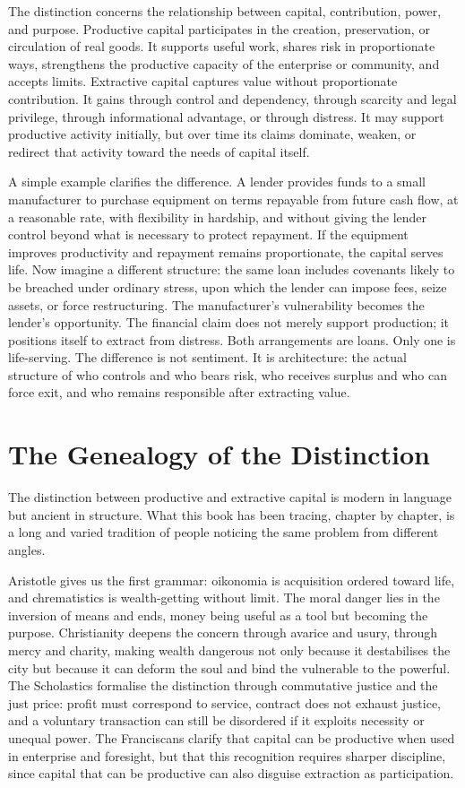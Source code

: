 \documentclass[11pt,a4paper,oneside]{book}
\begin{document}
The distinction concerns the relationship between capital, contribution, power, and purpose. Productive capital participates in the creation, preservation, or circulation of real goods. It supports useful work, shares risk in proportionate ways, strengthens the productive capacity of the enterprise or community, and accepts limits. Extractive capital captures value without proportionate contribution. It gains through control and dependency, through scarcity and legal privilege, through informational advantage, or through distress. It may support productive activity initially, but over time its claims dominate, weaken, or redirect that activity toward the needs of capital itself.

A simple example clarifies the difference. A lender provides funds to a small manufacturer to purchase equipment on terms repayable from future cash flow, at a reasonable rate, with flexibility in hardship, and without giving the lender control beyond what is necessary to protect repayment. If the equipment improves productivity and repayment remains proportionate, the capital serves life. Now imagine a different structure: the same loan includes covenants likely to be breached under ordinary stress, upon which the lender can impose fees, seize assets, or force restructuring. The manufacturer's vulnerability becomes the lender's opportunity. The financial claim does not merely support production; it positions itself to extract from distress. Both arrangements are loans. Only one is life-serving. The difference is not sentiment. It is architecture: the actual structure of who controls and who bears risk, who receives surplus and who can force exit, and who remains responsible after extracting value.

\section*{The Genealogy of the Distinction}

The distinction between productive and extractive capital is modern in language but ancient in structure. What this book has been tracing, chapter by chapter, is a long and varied tradition of people noticing the same problem from different angles.

Aristotle gives us the first grammar: oikonomia is acquisition ordered toward life, and chrematistics is wealth-getting without limit. The moral danger lies in the inversion of means and ends, money being useful as a tool but becoming the purpose. Christianity deepens the concern through avarice and usury, through mercy and charity, making wealth dangerous not only because it destabilises the city but because it can deform the soul and bind the vulnerable to the powerful. The Scholastics formalise the distinction through commutative justice and the just price: profit must correspond to service, contract does not exhaust justice, and a voluntary transaction can still be disordered if it exploits necessity or unequal power. The Franciscans clarify that capital can be productive when used in enterprise and foresight, but that this recognition requires sharper discipline, since capital that can be productive can also disguise extraction as participation.
\end{document}
